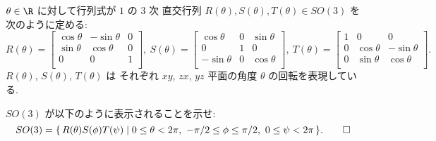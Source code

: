 \documentclass[12pt,twoside]{jarticle}
\begin{document}
$\theta\in\R$ に対して行列式が $1$ の $3$ 次
直交行列 $R(\theta), S(\theta), T(\theta) \in SO(3)$ を次のように定める:
{\small
\begin{equation*}
  R(\theta) =
  \begin{bmatrix}
    \cos\theta & -\sin\theta & 0 \\
    \sin\theta &  \cos\theta & 0 \\
    0          &  0          & 1 \\
  \end{bmatrix},
  \ %
  S(\theta) =
  \begin{bmatrix}
     \cos\theta & 0 & \sin\theta \\
     0          & 1 & 0          \\
    -\sin\theta & 0 & \cos\theta \\
  \end{bmatrix},
  \ %
  T(\theta) =
  \begin{bmatrix}
    1 & 0          &  0          \\
    0 & \cos\theta & -\sin\theta \\
    0 & \sin\theta &  \cos\theta \\
  \end{bmatrix}.
\end{equation*}
}$R(\theta)$, $S(\theta)$, $T(\theta)$ は
それぞれ $xy$, $zx$, $yz$ 平面の角度 $\theta$ の回転を表現している.


\begin{question}
\label{q:SO(3)=RST}
  $SO(3)$ が以下のように表示されることを示せ:
  \begin{equation*}
    SO(3) = 
    \{\, R(\theta)S(\phi)T(\psi) 
    \mid 0\le\theta<2\pi,\ -\pi/2\le\phi\le\pi/2,\ 0\le\psi<2\pi \,\}.
    \qed
  \end{equation*}
\end{question}
\end{document}
